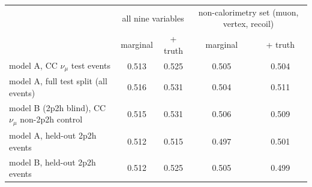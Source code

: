 \begin{tabular}{lcccc}
\toprule
 & \multicolumn{2}{c}{all nine variables} & \multicolumn{2}{c}{non-calorimetry set (muon, vertex, recoil)} \\
 & marginal & + truth & marginal & + truth \\
\midrule
model A, CC $\nu_\mu$ test events & 0.513 & 0.525 & 0.505 & 0.504 \\
model A, full test split (all events) & 0.516 & 0.531 & 0.504 & 0.511 \\
model B (2p2h blind), CC $\nu_\mu$ non-2p2h control & 0.515 & 0.531 & 0.506 & 0.509 \\
model A, held-out 2p2h events & 0.512 & 0.515 & 0.497 & 0.501 \\
model B, held-out 2p2h events & 0.512 & 0.525 & 0.505 & 0.499 \\
\bottomrule
\end{tabular}
